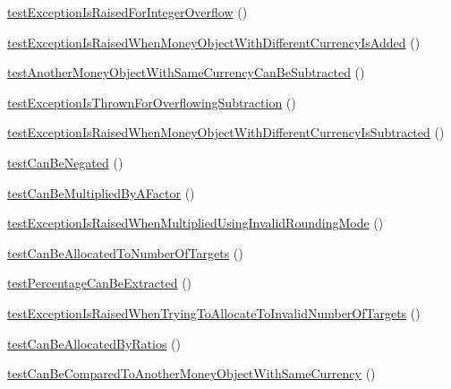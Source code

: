 \begin{DoxyCompactItemize}
\item 
\hyperlink{classSebastianBergmann_1_1Money_1_1MoneyTest_abf8b34d9ee8bf1802488b31934caf20f}{test\+Exception\+Is\+Raised\+For\+Integer\+Overflow} ()
\item 
\hyperlink{classSebastianBergmann_1_1Money_1_1MoneyTest_a9f8f24b674a048eef0734a294d5def80}{test\+Exception\+Is\+Raised\+When\+Money\+Object\+With\+Different\+Currency\+Is\+Added} ()
\item 
\hyperlink{classSebastianBergmann_1_1Money_1_1MoneyTest_a87ec71f75bcef5d83ebfc54713a6f1fa}{test\+Another\+Money\+Object\+With\+Same\+Currency\+Can\+Be\+Subtracted} ()
\item 
\hyperlink{classSebastianBergmann_1_1Money_1_1MoneyTest_a9ebe21281321cc7003f4baf3fffa61d8}{test\+Exception\+Is\+Thrown\+For\+Overflowing\+Subtraction} ()
\item 
\hyperlink{classSebastianBergmann_1_1Money_1_1MoneyTest_ad14fd24026a0ab3441a324d607076d90}{test\+Exception\+Is\+Raised\+When\+Money\+Object\+With\+Different\+Currency\+Is\+Subtracted} ()
\item 
\hyperlink{classSebastianBergmann_1_1Money_1_1MoneyTest_aaf65d586f64d17f5a4277d91b91901aa}{test\+Can\+Be\+Negated} ()
\item 
\hyperlink{classSebastianBergmann_1_1Money_1_1MoneyTest_a64a26d53ba643e98759d4fe494ece8e8}{test\+Can\+Be\+Multiplied\+By\+A\+Factor} ()
\item 
\hyperlink{classSebastianBergmann_1_1Money_1_1MoneyTest_a471a9bd6155baff8eaff16ade70990ba}{test\+Exception\+Is\+Raised\+When\+Multiplied\+Using\+Invalid\+Rounding\+Mode} ()
\item 
\hyperlink{classSebastianBergmann_1_1Money_1_1MoneyTest_aafe48a115f8cc71f0da1a1f48777f2e0}{test\+Can\+Be\+Allocated\+To\+Number\+Of\+Targets} ()
\item 
\hyperlink{classSebastianBergmann_1_1Money_1_1MoneyTest_af782770321d13a8efa318de08bb9ef59}{test\+Percentage\+Can\+Be\+Extracted} ()
\item 
\hyperlink{classSebastianBergmann_1_1Money_1_1MoneyTest_abc16f404f598f9df6550853d2543526f}{test\+Exception\+Is\+Raised\+When\+Trying\+To\+Allocate\+To\+Invalid\+Number\+Of\+Targets} ()
\item 
\hyperlink{classSebastianBergmann_1_1Money_1_1MoneyTest_a8f57dab9c7b408bee6d972e01ffb6f2a}{test\+Can\+Be\+Allocated\+By\+Ratios} ()
\item 
\hyperlink{classSebastianBergmann_1_1Money_1_1MoneyTest_a8ca2e5ce77814952552a66338e2fd037}{test\+Can\+Be\+Compared\+To\+Another\+Money\+Object\+With\+Same\+Currency} ()

\end{DoxyCompactItemize}
